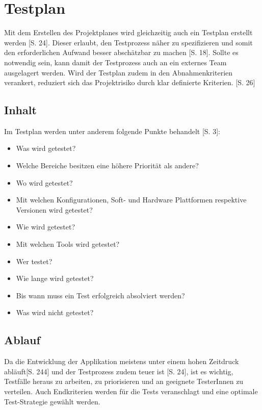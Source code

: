 \documentclass[a4paper,bibtotoc,oneside]{scrbook}
\begin{document}
\chapter{Testplan}

Mit dem Erstellen des Projektplanes wird gleichzeitig auch ein Testplan erstellt werden \cite{eval_automat_webapp_test}[S. 24]. Dieser erlaubt, den Testprozess näher zu spezifizieren und somit den erforderlichen Aufwand besser abschätzbar zu machen \cite{test_large_systems}[S. 18]. Sollte es notwendig sein, kann damit der Testprozess auch an ein externes Team ausgelagert werden. Wird der Testplan zudem in den Abnahmenkriterien verankert, reduziert sich das Projektrisiko durch klar definierte Kriterien. \cite{eval_automat_webapp_test}[S. 26]

\section{Inhalt}
Im Testplan werden unter anderem folgende Punkte behandelt \cite{test_auto}[S. 3]:

\begin{itemize}
	\item Was wird getestet? 
  \item Welche Bereiche besitzen eine höhere Priorität als andere?
	\item Wo wird getestet? 
  \item Mit welchen Konfigurationen, Soft- und Hardware Plattformen respektive Versionen wird getestet?
	\item Wie wird getestet? 
  \item Mit welchen Tools wird getestet?
	\item Wer testet?
	\item Wie lange wird getestet? 
  \item Bis wann muss ein Test erfolgreich absolviert werden?
	\item Was wird nicht getestet?
\end{itemize}


\section{Ablauf}
Da die Entwicklung der Applikation meistens unter einem hohen Zeitdruck abläuft\cite{software_qual}[S. 244] und der Testprozess zudem teuer ist \cite{eval_regression}[S. 24], ist es wichtig, Testfälle heraus zu arbeiten, zu priorisieren und an geeignete TesterInnen zu verteilen. Auch Endkriterien werden für die Tests veranschlagt und eine optimale Test-Strategie gewählt werden.
\end{document}
